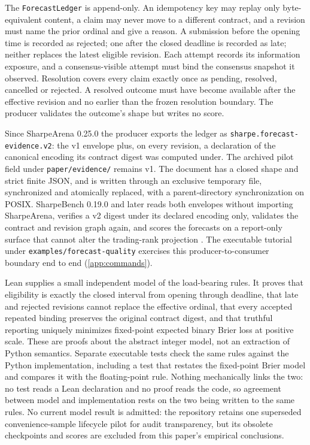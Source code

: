 The \texttt{ForecastLedger} is append-only. An idempotency key may replay only byte-equivalent content, a claim may never move to a different contract, and a revision must name the prior ordinal and give a reason. A submission before the opening time is recorded as rejected; one after the closed deadline is recorded as late; neither replaces the latest eligible revision. Each attempt records its information exposure, and a consensus-visible attempt must bind the consensus snapshot it observed. Resolution covers every claim exactly once as pending, resolved, cancelled or rejected. A resolved outcome must have become available after the effective revision and no earlier than the frozen resolution boundary. The producer validates the outcome's shape but writes no score.

Since SharpeArena 0.25.0 the producer exports the ledger as \texttt{sharpe.forecast-evidence.v2}: the v1 envelope plus, on every revision, a declaration of the canonical encoding its contract digest was computed under. The archived pilot field under \texttt{paper/evidence/} remains v1. The document has a closed shape and strict finite JSON, and is written through an exclusive temporary file, synchronized and atomically replaced, with a parent-directory synchronization on POSIX. SharpeBench 0.19.0 and later reads both envelopes without importing SharpeArena, verifies a v2 digest under its declared encoding only, validates the contract and revision graph again, and scores the forecasts on a report-only surface that cannot alter the trading-rank projection \citep{toca2026sharpebench}. The executable tutorial under \texttt{examples/forecast-quality} exercises this producer-to-consumer boundary end to end (\cref{app:commands}).

Lean supplies a small independent model of the load-bearing rules. It proves that eligibility is exactly the closed interval from opening through deadline, that late and rejected revisions cannot replace the effective ordinal, that every accepted repeated binding preserves the original contract digest, and that truthful reporting uniquely minimizes fixed-point expected binary Brier loss at positive scale. These are proofs about the abstract integer model, not an extraction of Python semantics. Separate executable tests check the same rules against the Python implementation, including a test that restates the fixed-point Brier model and compares it with the floating-point rule. Nothing mechanically links the two: no test reads a Lean declaration and no proof reads the code, so agreement between model and implementation rests on the two being written to the same rules. No current model result is admitted: the repository retains one superseded convenience-sample lifecycle pilot for audit transparency, but its obsolete checkpoints and scores are excluded from this paper's empirical conclusions.

